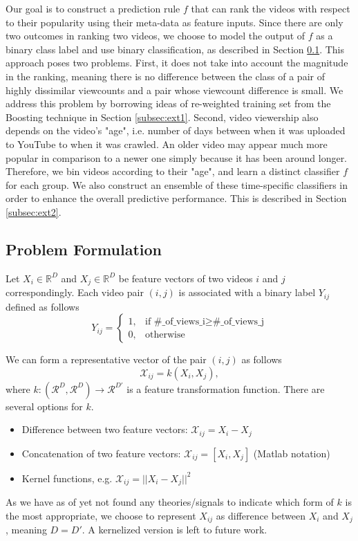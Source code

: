 Our goal is to construct a prediction rule $f$ that can rank the videos with respect to their popularity using their meta-data as feature inputs. Since there are only two outcomes in ranking two videos, we choose to model the output of $f$ as a binary class label and use binary classification, as described in Section \ref{subsec:probFormulation}. This approach poses two problems. First, it does not take into account the magnitude in the ranking, meaning there is no difference between the class of a pair of highly dissimilar viewcounts and a pair whose viewcount difference is small. We address this problem by borrowing ideas of re-weighted training set from the Boosting technique in Section \ref{subsec:ext1}. Second, video viewership also depends on the video's "age", i.e. number of days between when it was uploaded to YouTube to when it was crawled. An older video may appear much more popular in comparison to a newer one simply because it has been around longer.  Therefore, we bin videos according to their "age", and learn a distinct classifier $f$ for each group. We also construct an ensemble of these time-specific classifiers in order to enhance the overall predictive performance. This is described in Section \ref{subsec:ext2}.

\subsection{Problem Formulation}
\label{subsec:probFormulation}
	Let $X_i \in \mathbb{R}^D$ and $X_j \in \mathbb{R}^D$ be feature vectors of two videos $i$ and $j$ correspondingly. Each video pair $(i, j)$ is associated with a binary label $Y_{ij}$ defined as follows
		\begin{equation}
		Y_{ij} = \begin{cases}
				   1, & \text{if } \text{\#\_of\_views\_i} \geq \text{\#\_of\_views\_j} \\
				   0, & \text{otherwise}
				\end{cases} 
		\label{eqn:binaryLabel}			
		\end{equation}	

	We can form a representative vector of the pair $(i, j)$ as follows
		\begin{equation}
			\mathcal{X}_{ij} = k (X_i, X_j),
		\end{equation}
	where $k: (\mathcal{R}^D, \mathcal{R}^D) \rightarrow \mathcal{R}^{D'}$ is a feature transformation function. There are several options for $k$. 
	\begin{itemize}
		\item Difference between two feature vectors: $\mathcal{X}_{ij} = X_i - X_j$
		\item Concatenation of two feature vectors:  $\mathcal{X}_{ij} = [X_i, X_j]$ (Matlab notation)
		\item Kernel functions, e.g. $\mathcal{X}_{ij} = || X_i - X_j ||^2$
	\end{itemize}
	As we have as of yet not found any theories/signals to indicate which form of $k$ is the most appropriate, we choose to represent $X_{ij}$ as difference between $X_i$ and $X_j$, meaning $D = D'$. A kernelized version is left to future work.

